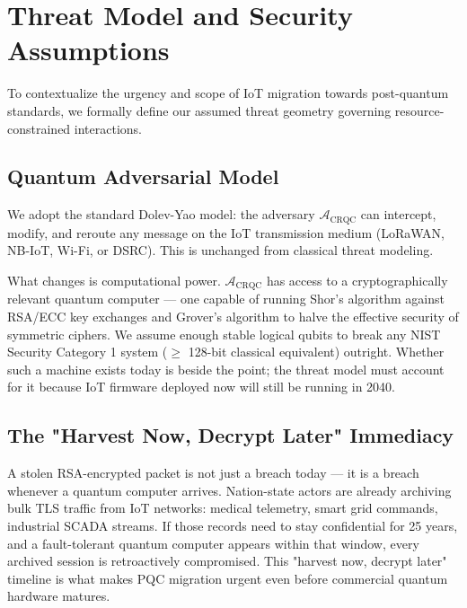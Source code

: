 \section{Threat Model and Security Assumptions}
\label{sec:threat_model}

To contextualize the urgency and scope of IoT migration towards post-quantum standards, we formally define our assumed threat geometry governing resource-constrained interactions.

\subsection{Quantum Adversarial Model}

We adopt the standard Dolev-Yao model: the adversary $\mathcal{A}_{\text{CRQC}}$ can intercept, modify, and reroute any message on the IoT transmission medium (LoRaWAN, NB-IoT, Wi-Fi, or DSRC). This is unchanged from classical threat modeling.

What changes is computational power. $\mathcal{A}_{\text{CRQC}}$ has access to a cryptographically relevant quantum computer — one capable of running Shor's algorithm \cite{shor1994algorithms} against RSA/ECC key exchanges and Grover's algorithm \cite{grover1996fast} to halve the effective security of symmetric ciphers. We assume enough stable logical qubits to break any NIST Security Category 1 system ($\geq$ 128-bit classical equivalent) outright. Whether such a machine exists today is beside the point; the threat model must account for it because IoT firmware deployed now will still be running in 2040.

\subsection{The "Harvest Now, Decrypt Later" Immediacy}

A stolen RSA-encrypted packet is not just a breach today — it is a breach whenever a quantum computer arrives. Nation-state actors are already archiving bulk TLS traffic from IoT networks: medical telemetry, smart grid commands, industrial SCADA streams. If those records need to stay confidential for 25 years, and a fault-tolerant quantum computer appears within that window, every archived session is retroactively compromised. This "harvest now, decrypt later" timeline is what makes PQC migration urgent even before commercial quantum hardware matures.

